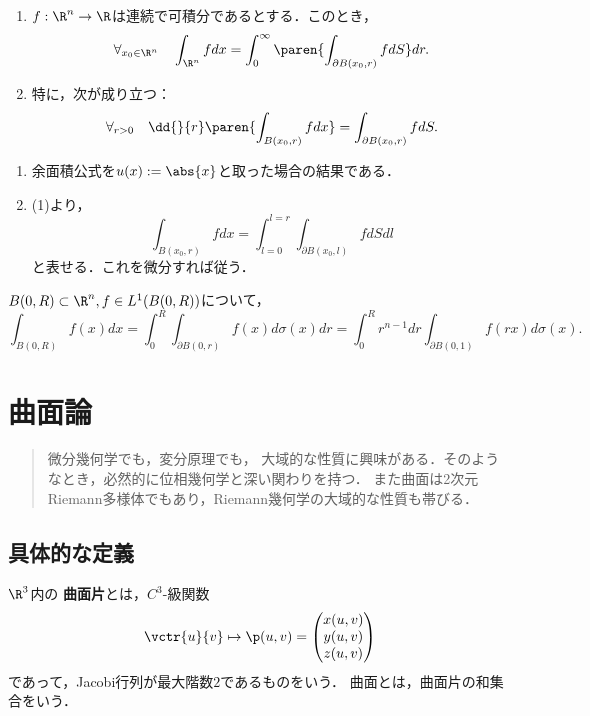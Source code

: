 \documentclass[uplatex,dvipdfmx]{jsreport}
\begin{document}
\begin{corollary}[球面積分の性質]\mbox{}\label{cor-property-of-ball-surface-integral}
    \begin{enumerate}
        \item $f:\R^n\to\R$は連続で可積分であるとする．このとき，
        \[\forall_{x_0\in\R^n}\quad\int_{\R^n}fdx=\int^\infty_0\paren{\int_{\partial B(x_0,r)}fdS}dr.\]
        \item 特に，次が成り立つ：
        \[\forall_{r>0}\quad\dd{}{r}\paren{\int_{B(x_0,r)}fdx}=\int_{\partial B(x_0,r)}fdS.\]
    \end{enumerate}
\end{corollary}
\begin{Proof}\mbox{}
    \begin{enumerate}
        \item 余面積公式を$u(x):=\abs{x}$と取った場合の結果である．
        \item (1)より，
        \[\int_{B(x_0,r)}fdx=\int_{l=0}^{l=r}\int_{\partial B(x_0,l)}fdSdl\]
        と表せる．これを微分すれば従う．
    \end{enumerate}
\end{Proof}

\begin{corollary}[球面上の積分と球体上の積分との関係]\label{thm-sphere-and-ball}
    $B(0,R)\subset\R^n, f\in L^1(B(0,R))$について，
    \[\int_{B(0,R)}f(x)dx=\int^R_0\int_{\partial B(0,r)}f(x)d\sigma(x)dr=\int^R_0r^{n-1}dr\int_{\partial B(0,1)}f(rx)d\sigma(x).\]
\end{corollary}

\chapter{曲面論}

\begin{quotation}
    微分幾何学でも，変分原理でも，
    大域的な性質に興味がある．そのようなとき，必然的に位相幾何学と深い関わりを持つ．
    また曲面は2次元Riemann多様体でもあり，Riemann幾何学の大域的な性質も帯びる．
\end{quotation}

\section{具体的な定義}

\begin{definition}
    $\R^3$内の
    \textbf{曲面片}とは，$C^3$-級関数
    \[\vctr{u}{v}\mapsto\p(u,v)=\begin{pmatrix}x(u,v)\\y(u,v)\\z(u,v)\end{pmatrix}\]
    であって，Jacobi行列が最大階数$2$であるものをいう． 
    曲面とは，曲面片の和集合をいう．
\end{definition}
\end{document}
